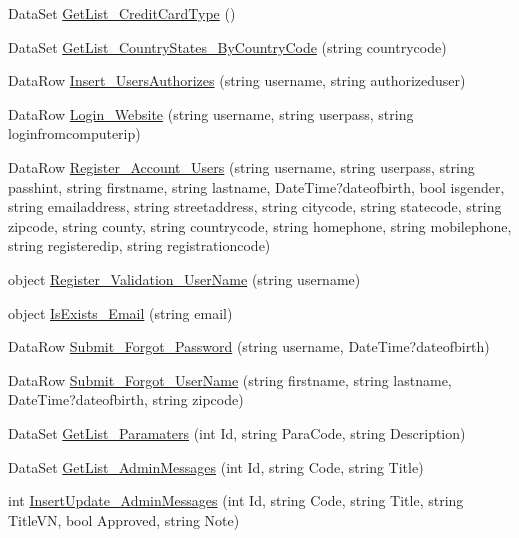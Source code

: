 \begin{DoxyCompactItemize}
\item 
Data\-Set \hyperlink{class_d_b_class_a98f847d55e901665e418585ab706d4f4}{Get\-List\-\_\-\-Credit\-Card\-Type} ()
\item 
Data\-Set \hyperlink{class_d_b_class_a69f8d21cf730d614bdef36908ac343b3}{Get\-List\-\_\-\-Country\-States\-\_\-\-By\-Country\-Code} (string countrycode)
\item 
Data\-Row \hyperlink{class_d_b_class_ae4be85d37203b9423b92f4dd84a9a00d}{Insert\-\_\-\-Users\-Authorizes} (string username, string authorizeduser)
\item 
Data\-Row \hyperlink{class_d_b_class_aada5d4b0954419f23fcf368df799bd0c}{Login\-\_\-\-Website} (string username, string userpass, string loginfromcomputerip)
\item 
Data\-Row \hyperlink{class_d_b_class_ae7cb22c9fabc0e90288382a3d52c497c}{Register\-\_\-\-Account\-\_\-\-Users} (string username, string userpass, string passhint, string firstname, string lastname, Date\-Time?dateofbirth, bool isgender, string emailaddress, string streetaddress, string citycode, string statecode, string zipcode, string county, string countrycode, string homephone, string mobilephone, string registeredip, string registrationcode)
\item 
object \hyperlink{class_d_b_class_a08bd9c83614e63a7d978da2cde32d395}{Register\-\_\-\-Validation\-\_\-\-User\-Name} (string username)
\item 
object \hyperlink{class_d_b_class_a6e15594a3adc8194e932b15597421971}{Is\-Exists\-\_\-\-Email} (string email)
\item 
Data\-Row \hyperlink{class_d_b_class_a11e3e7a443614ac51a5a20155afb68b3}{Submit\-\_\-\-Forgot\-\_\-\-Password} (string username, Date\-Time?dateofbirth)
\item 
Data\-Row \hyperlink{class_d_b_class_a4946c6d4c6f92b0c79f64e8fe5bba494}{Submit\-\_\-\-Forgot\-\_\-\-User\-Name} (string firstname, string lastname, Date\-Time?dateofbirth, string zipcode)
\item 
Data\-Set \hyperlink{class_d_b_class_a46e602b287204bdccd5f684ed5cfddd1}{Get\-List\-\_\-\-Paramaters} (int Id, string Para\-Code, string Description)
\item 
Data\-Set \hyperlink{class_d_b_class_a37ba813f04c86f37ae0ff356c924daa3}{Get\-List\-\_\-\-Admin\-Messages} (int Id, string Code, string Title)
\item 
int \hyperlink{class_d_b_class_a839d19f3269b0cffbd7fad1600102b1a}{Insert\-Update\-\_\-\-Admin\-Messages} (int Id, string Code, string Title, string Title\-V\-N, bool Approved, string Note)

\end{DoxyCompactItemize}
